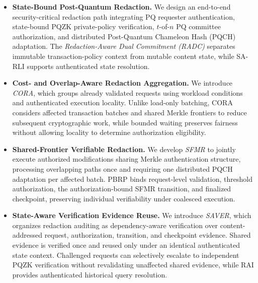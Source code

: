 \documentclass[lettersize,journal]{IEEEtran}
\begin{document}
\begin{itemize}

\item \textbf{State-Bound Post-Quantum Redaction.}
We design an end-to-end security-critical redaction path integrating
PQ requester authentication, state-bound PQZK private-policy
verification, $t$-of-$n$ PQ committee authorization, and distributed
Post-Quantum Chameleon Hash (PQCH) adaptation. The
\emph{Redaction-Aware Dual Commitment (RADC)} separates immutable
transaction-policy context from mutable content state, while SA-RLI
supports authenticated state resolution.

\item \textbf{Cost- and Overlap-Aware Redaction Aggregation.}
We introduce \emph{CORA}, which groups already validated requests using
workload conditions and authenticated execution locality. Unlike
load-only batching, CORA considers affected transaction batches and
shared Merkle frontiers to reduce subsequent cryptographic work, while
bounded waiting preserves fairness without allowing locality to
determine authorization eligibility.

\item \textbf{Shared-Frontier Verifiable Redaction.}
We develop \emph{SFMR} to jointly execute authorized modifications
sharing Merkle authentication structure, processing overlapping paths
once and requiring one distributed PQCH adaptation per affected batch.
PBRP binds request-level validation, threshold authorization, the
authorization-bound SFMR transition, and finalized checkpoint,
preserving individual verifiability under coalesced execution.

\item \textbf{State-Aware Verification Evidence Reuse.}
We introduce \emph{SAVER}, which organizes redaction auditing as
dependency-aware verification over content-addressed request,
authorization, transition, and checkpoint evidence. Shared evidence is
verified once and reused only under an identical authenticated state
context. Challenged requests can selectively escalate to independent
PQZK verification without revalidating unaffected shared evidence,
while RAI provides authenticated historical query resolution.

\end{itemize}


    
\end{document}
